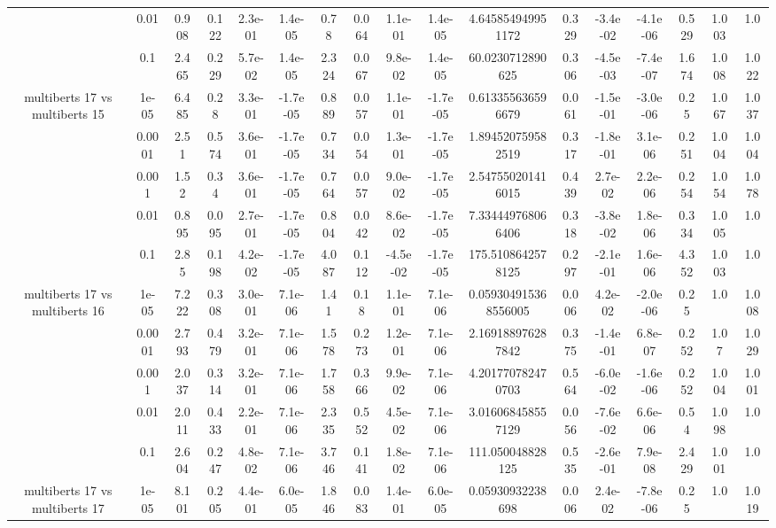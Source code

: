 \begin{tabular}{|c|c|c|c|c|c|c|c|c|c|c|c|c|c|c|c|c|}
 & 0.01 & 0.908 & 0.122 & 2.3e-01 & 1.4e-05 & 0.78 & 0.064 & 1.1e-01 & 1.4e-05 & 4.645854949951172 & 0.329 & -3.4e-02 & -4.1e-06 & 0.529 & 1.003 & 1.0 \\
 & 0.1 & 2.465 & 0.229 & 5.7e-02 & 1.4e-05 & 2.324 & 0.067 & 9.8e-02 & 1.4e-05 & 60.0230712890625 & 0.306 & -4.5e-03 & -7.4e-07 & 1.674 & 1.008 & 1.022 \\
\hline
\multirow{5}{*}{multiberts 17 vs multiberts 15} & 1e-05 & 6.485 & 0.28 & 3.3e-01 & -1.7e-05 & 0.889 & 0.057 & 1.1e-01 & -1.7e-05 & 0.613355636596679 & 0.061 & -1.5e-01 & -3.0e-06 & 0.25 & 1.067 & 1.037 \\
 & 0.0001 & 2.51 & 0.574 & 3.6e-01 & -1.7e-05 & 0.734 & 0.054 & 1.3e-01 & -1.7e-05 & 1.894520759582519 & 0.317 & -1.8e-01 & 3.1e-06 & 0.251 & 1.004 & 1.004 \\
 & 0.001 & 1.52 & 0.34 & 3.6e-01 & -1.7e-05 & 0.764 & 0.057 & 9.0e-02 & -1.7e-05 & 2.547550201416015 & 0.439 & 2.7e-02 & 2.2e-06 & 0.254 & 1.054 & 1.078 \\
 & 0.01 & 0.895 & 0.095 & 2.7e-01 & -1.7e-05 & 0.804 & 0.042 & 8.6e-02 & -1.7e-05 & 7.334449768066406 & 0.318 & -3.8e-02 & 1.8e-06 & 0.334 & 1.005 & 1.0 \\
 & 0.1 & 2.85 & 0.198 & 4.2e-02 & -1.7e-05 & 4.087 & 0.112 & -4.5e-02 & -1.7e-05 & 175.5108642578125 & 0.297 & -2.1e-01 & 1.6e-06 & 4.352 & 1.003 & 1.0 \\
\hline
\multirow{5}{*}{multiberts 17 vs multiberts 16} & 1e-05 & 7.222 & 0.308 & 3.0e-01 & 7.1e-06 & 1.41 & 0.18 & 1.1e-01 & 7.1e-06 & 0.059304915368556005 & 0.006 & 4.2e-02 & -2.0e-06 & 0.25 & 1.0 & 1.008 \\
 & 0.0001 & 2.793 & 0.479 & 3.2e-01 & 7.1e-06 & 1.578 & 0.273 & 1.2e-01 & 7.1e-06 & 2.169188976287842 & 0.375 & -1.4e-01 & 6.8e-07 & 0.252 & 1.07 & 1.029 \\
 & 0.001 & 2.037 & 0.314 & 3.2e-01 & 7.1e-06 & 1.758 & 0.366 & 9.9e-02 & 7.1e-06 & 4.201770782470703 & 0.564 & -6.0e-02 & -1.6e-06 & 0.252 & 1.004 & 1.001 \\
 & 0.01 & 2.011 & 0.433 & 2.2e-01 & 7.1e-06 & 2.335 & 0.552 & 4.5e-02 & 7.1e-06 & 3.016068458557129 & 0.056 & -7.6e-02 & 6.6e-06 & 0.54 & 1.098 & 1.0 \\
 & 0.1 & 2.604 & 0.247 & 4.8e-02 & 7.1e-06 & 3.746 & 0.141 & 1.8e-02 & 7.1e-06 & 111.050048828125 & 0.535 & -2.6e-01 & 7.9e-08 & 2.429 & 1.001 & 1.0 \\
\hline
\multirow{5}{*}{multiberts 17 vs multiberts 17} & 1e-05 & 8.101 & 0.205 & 4.4e-01 & 6.0e-05 & 1.846 & 0.083 & 1.4e-01 & 6.0e-05 & 0.05930932238698 & 0.006 & 2.4e-02 & -7.8e-06 & 0.25 & 1.0 & 1.019 \\

\end{tabular}
